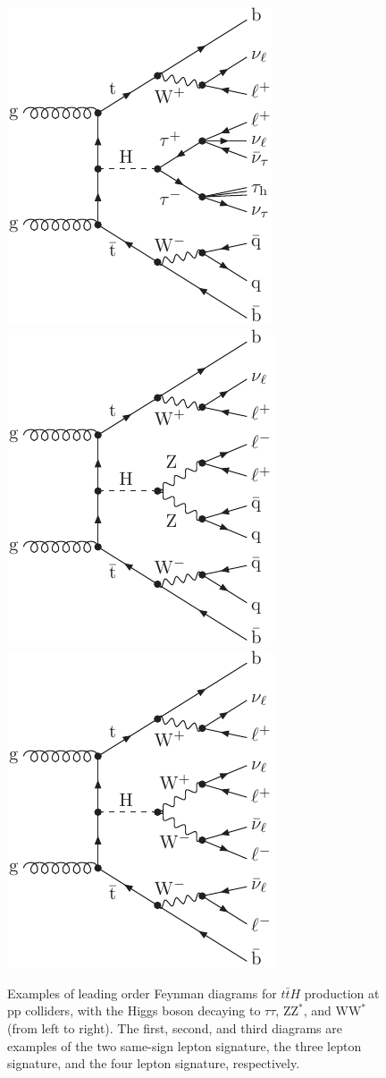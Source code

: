 \begin{figure}[htb]
\centering
\includegraphics[width=0.30\linewidth]{diagrams/gg-ttH-tt-2lss.pdf} 
\hspace{0.5cm}
\includegraphics[width=0.30\linewidth]{diagrams/gg-ttH-ZZ-3l.pdf}
\hspace{0.5cm}
\includegraphics[width=0.30\linewidth]{diagrams/gg-ttH-WW-4l.pdf}
\caption{Examples of leading order Feynman diagrams for $t\bar{t}H$ production at pp colliders, with the Higgs boson decaying to
$\tau\tau$, $\mathrm{ZZ}^{*}$, and
$\mathrm{WW}^{*}$ (from left to right). The first, second, and third diagrams are examples of the two same-sign lepton signature,
the three lepton signature, and the four lepton signature, respectively.} 
\label{fig:feyn}
\end{figure}

\clearpage
